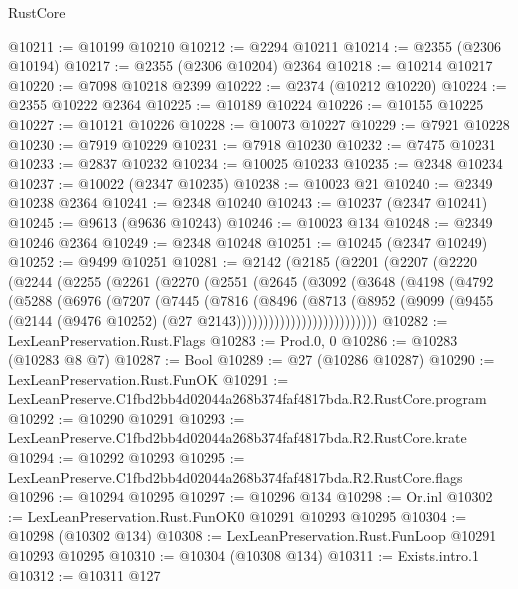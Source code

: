 \begin{lexlean}{RustCore}
\begin{coremodule}
@10211 := @10199 @10210
@10212 := @2294 @10211
@10214 := @2355 (@2306 @10194)
@10217 := @2355 (@2306 @10204) @2364
@10218 := @10214 @10217
@10220 := @7098 @10218 @2399
@10222 := @2374 (@10212 @10220)
@10224 := @2355 @10222 @2364
@10225 := @10189 @10224
@10226 := @10155 @10225
@10227 := @10121 @10226
@10228 := @10073 @10227
@10229 := @7921 @10228
@10230 := @7919 @10229
@10231 := @7918 @10230
@10232 := @7475 @10231
@10233 := @2837 @10232
@10234 := @10025 @10233
@10235 := @2348 @10234
@10237 := @10022 (@2347 @10235)
@10238 := @10023 @21
@10240 := @2349 @10238 @2364
@10241 := @2348 @10240
@10243 := @10237 (@2347 @10241)
@10245 := @9613 (@9636 @10243)
@10246 := @10023 @134
@10248 := @2349 @10246 @2364
@10249 := @2348 @10248
@10251 := @10245 (@2347 @10249)
@10252 := @9499 @10251
@10281 := @2142
    (@2185
      (@2201
        (@2207
          (@2220
            (@2244
              (@2255
                (@2261
                  (@2270
                    (@2551
                      (@2645
                        (@3092
                          (@3648
                            (@4198
                              (@4792
                                (@5288
                                  (@6976
                                    (@7207
                                      (@7445
                                        (@7816
                                          (@8496
                                            (@8713
                                              (@8952
                                                (@9099
                                                  (@9455
                                                    (@2144
                                                      (@9476 @10252)
                                                      (@27 @2143))))))))))))))))))))))))))
@10282 := LexLeanPreservation.Rust.Flags
@10283 := Prod.{0, 0}
@10286 := @10283 (@10283 @8 @7)
@10287 := Bool
@10289 := @27 (@10286 @10287)
@10290 := LexLeanPreservation.Rust.FunOK
@10291 := LexLeanPreserve.C1fbd2bb4d02044a268b374faf4817bda.R2.RustCore.program
@10292 := @10290 @10291
@10293 := LexLeanPreserve.C1fbd2bb4d02044a268b374faf4817bda.R2.RustCore.krate
@10294 := @10292 @10293
@10295 := LexLeanPreserve.C1fbd2bb4d02044a268b374faf4817bda.R2.RustCore.flags
@10296 := @10294 @10295
@10297 := @10296 @134
@10298 := Or.inl
@10302 := LexLeanPreservation.Rust.FunOK0 @10291 @10293 @10295
@10304 := @10298 (@10302 @134)
@10308 := LexLeanPreservation.Rust.FunLoop @10291 @10293 @10295
@10310 := @10304 (@10308 @134)
@10311 := Exists.intro.{1}
@10312 := @10311 @127

\end{coremodule}
\end{lexlean}
